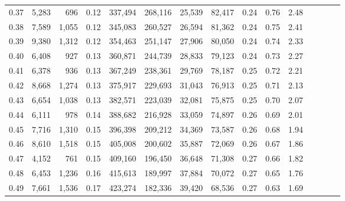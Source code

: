 \begin{tabular}{rrrcrrrrrrrrrrr}
0.37 &   5,283 &     696 &                                       0.12 &  337,494 &  268,116 &   25,539 &   82,417 &  0.24 &  0.76 &                         2.48 \\
0.38 &   7,589 &   1,055 &                                       0.12 &  345,083 &  260,527 &   26,594 &   81,362 &  0.24 &  0.75 &                         2.41 \\
0.39 &   9,380 &   1,312 &                                       0.12 &  354,463 &  251,147 &   27,906 &   80,050 &  0.24 &  0.74 &                         2.33 \\
0.40 &   6,408 &     927 &                                       0.13 &  360,871 &  244,739 &   28,833 &   79,123 &  0.24 &  0.73 &                         2.27 \\
0.41 &   6,378 &     936 &                                       0.13 &  367,249 &  238,361 &   29,769 &   78,187 &  0.25 &  0.72 &                         2.21 \\
0.42 &   8,668 &   1,274 &                                       0.13 &  375,917 &  229,693 &   31,043 &   76,913 &  0.25 &  0.71 &                         2.13 \\
0.43 &   6,654 &   1,038 &                                       0.13 &  382,571 &  223,039 &   32,081 &   75,875 &  0.25 &  0.70 &                         2.07 \\
0.44 &   6,111 &     978 &                                       0.14 &  388,682 &  216,928 &   33,059 &   74,897 &  0.26 &  0.69 &                         2.01 \\
0.45 &   7,716 &   1,310 &                                       0.15 &  396,398 &  209,212 &   34,369 &   73,587 &  0.26 &  0.68 &                         1.94 \\
0.46 &   8,610 &   1,518 &                                       0.15 &  405,008 &  200,602 &   35,887 &   72,069 &  0.26 &  0.67 &                         1.86 \\
0.47 &   4,152 &     761 &                                       0.15 &  409,160 &  196,450 &   36,648 &   71,308 &  0.27 &  0.66 &                         1.82 \\
0.48 &   6,453 &   1,236 &                                       0.16 &  415,613 &  189,997 &   37,884 &   70,072 &  0.27 &  0.65 &                         1.76 \\
0.49 &   7,661 &   1,536 &                                       0.17 &  423,274 &  182,336 &   39,420 &   68,536 &  0.27 &  0.63 &                         1.69 \\

\end{tabular}
